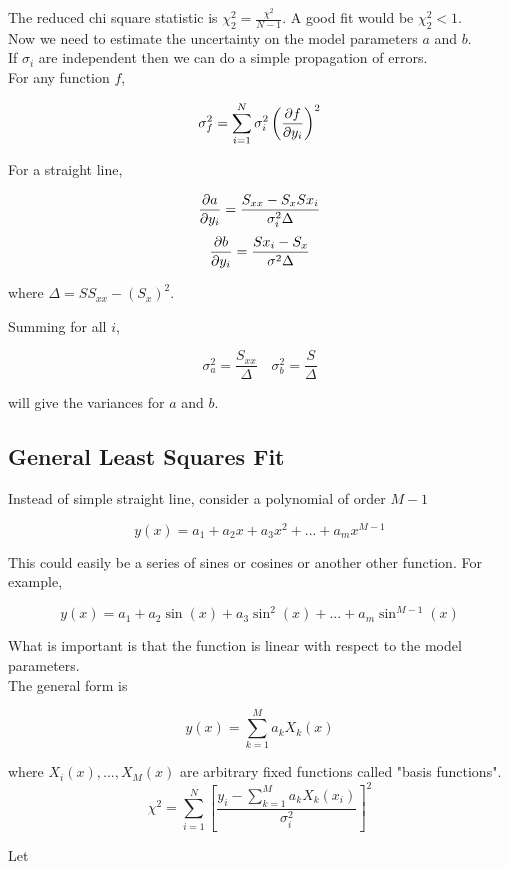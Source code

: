 \documentclass[]{article}
\begin{document}
The reduced chi square statistic is  $\chi^2_2 = \frac{\chi^2}{N-1}$. A good fit would be $\chi^2_2 < 1$.\\

Now we need to estimate the uncertainty on the model parameters $a$ and $b$.\\

If $\sigma_i$ are independent then we can do a simple propagation of errors.\\

For any function $f$,

\[\sigma_f^2 = \sum_{i=1}^N \sigma_i^2 \left(\pdv{f}{y_i}\right)^2\] 

For a straight line,

\[\pdv{a}{y_i} = \frac{S_{xx} - S_{x}Sx_i}{\sigma_i^2 \Delta}\]
\[\pdv{b}{y_i} = \frac{Sx_i - S_{x}}{\sigma^2 \Delta}\]

where $\Delta = S S_{xx} - (S_x)^2$.

Summing for all $i$,

\[\sigma_a^2 = \frac{S_{xx}}{\Delta} \quad \sigma_b^2 = \frac{S}{\Delta}\]

will give the variances for $a$ and $b$.\\


\subsection{General Least Squares Fit}\bigbreak

Instead of simple straight line, consider a polynomial of order $M-1$

\[y(x) = a_1 + a_2x + a_3x^2 + ... + a_m x^{M-1}\]

This could easily be a series of sines or cosines or another other function. For example,

\[y(x) = a_1 + a_2\sin(x) + a_3\sin^2(x) + ... + a_m \sin^{M-1}(x)\]

What is important is that the function is linear with respect to the model parameters.\\

The general form is

\[y(x) = \sum_{k=1}^M a_k X_k(x) \]

where $X_i(x), ..., X_M(x)$ are arbitrary fixed functions called "basis functions".\\

\[\chi^2 = \sum_{i=1}^N \left[\frac{y_i - \sum_{k=1}^M a_k X_k(x_i)}{\sigma_i^2}\right]^2\]

Let
\end{document}
